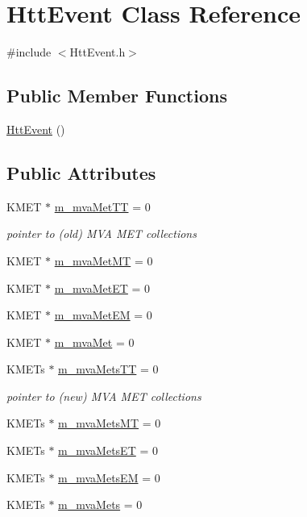 \hypertarget{classHttEvent}{
\section{HttEvent Class Reference}
\label{classHttEvent}
}


{\ttfamily \#include $<$HttEvent.h$>$}\subsection*{Public Member Functions}
\begin{DoxyCompactItemize}
\item 
\hyperlink{classHttEvent_adb37c8d249d0c49210cd01694f7b6e92}{HttEvent} ()
\end{DoxyCompactItemize}
\subsection*{Public Attributes}
\begin{DoxyCompactItemize}
\item 
KMET $\ast$ \hyperlink{classHttEvent_a310f3609ddc213111401235740b14d68}{m\_\-mvaMetTT} = 0
\begin{DoxyCompactList}\small\item\em pointer to (old) MVA MET collections \item\end{DoxyCompactList}\item 
KMET $\ast$ \hyperlink{classHttEvent_a28fc6af14c812f81468a843344c40384}{m\_\-mvaMetMT} = 0
\item 
KMET $\ast$ \hyperlink{classHttEvent_ae89b1c18197efcd1ab75566d6ba04f49}{m\_\-mvaMetET} = 0
\item 
KMET $\ast$ \hyperlink{classHttEvent_a34ce25e1c99be89510a591d80b159e87}{m\_\-mvaMetEM} = 0
\item 
KMET $\ast$ \hyperlink{classHttEvent_a960094fe213f6d23d0b4579f0843551d}{m\_\-mvaMet} = 0
\item 
KMETs $\ast$ \hyperlink{classHttEvent_a5a9182d2a929b51f43cd17597695308f}{m\_\-mvaMetsTT} = 0
\begin{DoxyCompactList}\small\item\em pointer to (new) MVA MET collections \item\end{DoxyCompactList}\item 
KMETs $\ast$ \hyperlink{classHttEvent_a4ee315cb90481baacb4ca22de7d98195}{m\_\-mvaMetsMT} = 0
\item 
KMETs $\ast$ \hyperlink{classHttEvent_a0ce8ee3c61b3b8b8b7b48174116b9274}{m\_\-mvaMetsET} = 0
\item 
KMETs $\ast$ \hyperlink{classHttEvent_aa2d80544d49b539aea153ed9126643ce}{m\_\-mvaMetsEM} = 0
\item 
KMETs $\ast$ \hyperlink{classHttEvent_a325b2774a25fd9898dd4ed29dae04871}{m\_\-mvaMets} = 0
\end{DoxyCompactItemize}


